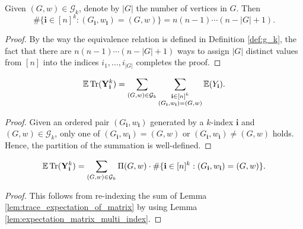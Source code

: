 \begin{lemma}
  \label{lem:lem_4.3}
  Given $(G,w) \in \mathcal{G}_k$, denote by $|G|$ the number of vertices in $G$. Then
  \[
  \# \{ \mathbf{i} \in [n]^k : (G_\mathbf{i},w_\mathbf{i}) = (G,w) \} = n (n-1) \cdots (n - |G| + 1).
  \]
\end{lemma}
\begin{proof}
  By the way the equivalence relation is defined in Definition \ref{def:g_k}, 
  the fact that there are $n (n - 1) \cdots (n -|G| + 1)$ ways to assign $|G|$ distinct values from $[n]$ into the indices $i_1,...,i_{|G|}$ completes the proof.
\end{proof}
\begin{lemma}
  \label{lem:equation_4.5_1}
  \[
  \mathbb{E} \operatorname{Tr} (\mathbf{Y}_\mathbf{i}^k) = \sum_{(G,w) \in \mathcal{G}_k} \sum_{\substack{\mathbf{i} \in [n]^k \\ (G_\mathbf{i},w_\mathbf{i}) = (G,w)}} \mathbb{E} (Y_\mathbf{i}).
  \]
\end{lemma}
\begin{proof}
  Given an ordered pair $(G_\mathbf{i},w_\mathbf{i})$ generated by a $k$-index $\mathbf{i}$ and $(G,w) \in \mathcal{G}_k$, 
  only one of $(G_\mathbf{i},w_\mathbf{i}) = (G,w)$ or $(G_\mathbf{i},w_\mathbf{i}) \neq (G,w)$ holds. 
  Hence, the partition of the summation is well-defined.
\end{proof}
\begin{lemma}
  \label{lem:equation_4.5_2}
  \[
  \mathbb{E} \operatorname{Tr} (\mathbf{Y}_\mathbf{i}^k) = \sum_{(G,w) \in \mathcal{G}_k} \Pi (G,w) \cdot \# \{ \mathbf{i} \in [n]^k : (G_\mathbf{i},w_\mathbf{i}) = (G,w) \}.
  \]
\end{lemma}
\begin{proof}
  This follows from re-indexing the sum of Lemma \ref{lem:trace_expectation_of_matrix} by using Lemma \ref{lem:expectation_matrix_multi_index}.
\end{proof}
